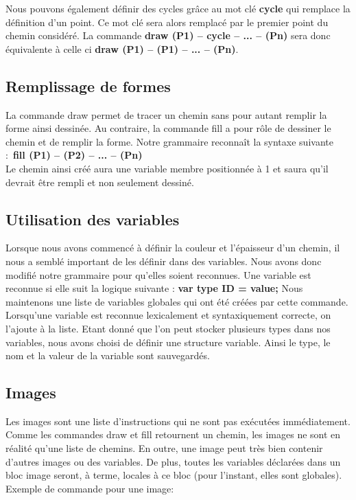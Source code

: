 \documentclass[a4paper, 12pt]{report}
\begin{document}
Nous pouvons également définir des cycles grâce au mot clé \textbf{cycle} qui remplace la définition d'un point. Ce mot clé sera alors remplacé par le premier point du chemin considéré. La commande \textbf{draw (P1) -- cycle -- ... -- (Pn)} sera donc équivalente à celle ci \textbf{draw (P1) -- (P1) -- ... -- (Pn)}.

\subsection{Remplissage de formes}

La commande draw permet de tracer un chemin sans pour autant remplir la forme ainsi dessinée. Au contraire, la commande fill a pour rôle de dessiner le chemin et de remplir la forme. Notre grammaire reconnaît la syntaxe suivante :\
\textbf{fill (P1) -- (P2) -- ... -- (Pn)}\\
Le chemin ainsi créé aura une variable membre positionnée à 1 et saura qu'il devrait \^etre rempli et non seulement dessiné.

\subsection{Utilisation des variables}
Lorsque nous avons commencé à définir la couleur et l'épaisseur d'un chemin, il nous a semblé important de les définir dans des variables. Nous avons donc modifié notre grammaire pour qu'elles soient reconnues. Une variable est reconnue si elle suit la logique suivante :
\textbf{var type ID = value;}
Nous maintenons une liste de variables globales qui ont été créées par cette commande. Lorsqu'une variable est reconnue lexicalement et syntaxiquement correcte, on l'ajoute à la liste. Etant donné que l'on peut stocker plusieurs types dans nos variables, nous avons choisi de définir une structure variable. Ainsi le type, le nom et la valeur de la variable sont sauvegardés.


\subsection{Images}
Les images sont une liste d'instructions qui ne sont pas exécutées immédiatement. Comme les commandes draw et fill retournent un chemin, les images ne sont en réalité qu'une liste de chemins. En outre, une image peut très bien contenir d'autres images ou des variables. De plus, toutes les variables déclarées dans un bloc image seront, à terme, locales à ce bloc (pour l'instant, elles sont globales). Exemple de commande pour une image:\\
\end{document}
